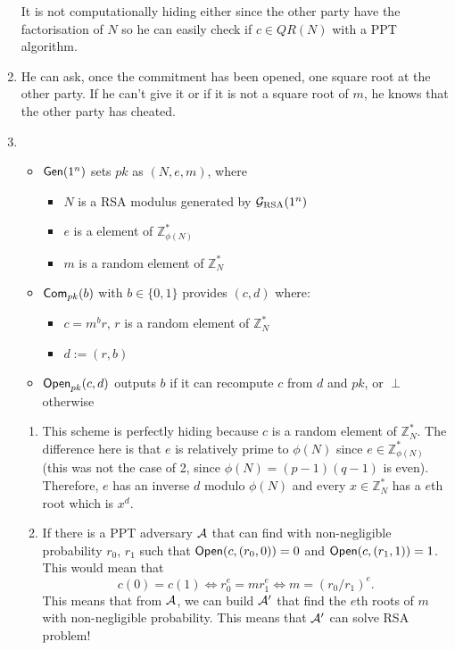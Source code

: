 \begin{solution}
\begin{enumerate}
      It is not computationally hiding either since the other party have the factorisation of $N$
      so he can easily check if $c \in QR(N)$ with a PPT algorithm.
    \item
      He can ask, once the commitment has been opened,
      one square root at the other party.
      If he can't give it or if it is not a square root of $m$, he knows that the other party has cheated.
    \item
      \begin{itemize}
        \item $\operatorname{\mathsf{Gen}}(1^n)$ sets $pk$ as $(N,e,m)$, where
          \begin{itemize}
            \item $N$ is a RSA modulus generated by $\mathcal{G}_\mathrm{RSA}(1^n)$
            \item $e$ is a element of $\mathbb{Z}_{\phi(N)}^*$
            \item $m$ is a random element of $\mathbb{Z}_{N}^*$
          \end{itemize}
        \item $\operatorname{\mathsf{Com}}_{pk}(b)$ with $b \in \{0,1\}$ provides $(c,d)$ where:
          \begin{itemize}
            \item $c = m^br$, $r$ is a random element of $\mathbb{Z}_N^*$
            \item $d := (r, b)$
          \end{itemize}
        \item $\operatorname{\mathsf{Open}}_{pk}(c, d)$ outputs $b$ if it can recompute $c$ from $d$ and $pk$, or $\perp$ otherwise
      \end{itemize}
      \begin{enumerate}
        \item
          This scheme is perfectly hiding because $c$ is a random element of $\mathbb{Z}_N^*$.
          The difference here is that $e$ is relatively prime to $\phi(N)$ since $e \in \mathbb{Z}_{\phi(N)}^*$ (this was not the case of 2, since $\phi(N) = (p-1)(q-1)$ is even).
          Therefore, $e$ has an inverse $d$ modulo $\phi(N)$ and every $x \in \mathbb{Z}_N^*$ has a $e$th root which is $x^d$.
        \item
          If there is a PPT adversary $\mathcal{A}$ that can find with non-negligible probability
          $r_{0}$, $r_{1}$ such that $\operatorname{\mathsf{Open}}(c, (r_{0}, 0))=0$ and
          $\operatorname{\mathsf{Open}}(c, (r_{1}, 1))=1$. This would mean that
          \[ c(0)=c(1) \Leftrightarrow r_{0}^e=mr_{1}^e \Leftrightarrow m=(r_{0}/r_{1})^e. \]
          This means that from $\mathcal{A}$, we can build $\mathcal{A}'$ that find the $e$th roots of $m$ with non-negligible probability.
          This means that $\mathcal{A}'$ can solve RSA problem!


\end{enumerate}
\end{enumerate}
\end{solution}

